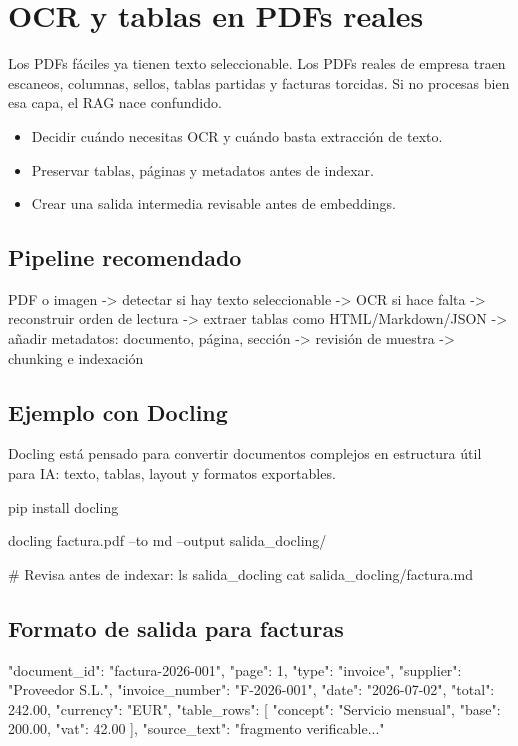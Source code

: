 \documentclass[11pt,a4paper]{book}
\begin{document}
\chapter{OCR y tablas en PDFs reales}
Los PDFs fáciles ya tienen texto seleccionable. Los PDFs reales de empresa traen escaneos, columnas, sellos, tablas partidas y facturas torcidas. Si no procesas bien esa capa, el RAG nace confundido.

\begin{itemize}\item Decidir cuándo necesitas OCR y cuándo basta extracción de texto.\end{itemize}
\begin{itemize}\item Preservar tablas, páginas y metadatos antes de indexar.\end{itemize}
\begin{itemize}\item Crear una salida intermedia revisable antes de embeddings.\end{itemize}
\section{Pipeline recomendado}
\begin{codebox}
PDF o imagen
  -> detectar si hay texto seleccionable
  -> OCR si hace falta
  -> reconstruir orden de lectura
  -> extraer tablas como HTML/Markdown/JSON
  -> añadir metadatos: documento, página, sección
  -> revisión de muestra
  -> chunking e indexación
\end{codebox}
\section{Ejemplo con Docling}
Docling está pensado para convertir documentos complejos en estructura útil para IA: texto, tablas, layout y formatos exportables.

\begin{codebox}
pip install docling

docling factura.pdf --to md --output salida_docling/

# Revisa antes de indexar:
ls salida_docling
cat salida_docling/factura.md
\end{codebox}
\section{Formato de salida para facturas}
\begin{codebox}
{
  "document_id": "factura-2026-001",
  "page": 1,
  "type": "invoice",
  "supplier": "Proveedor S.L.",
  "invoice_number": "F-2026-001",
  "date": "2026-07-02",
  "total": 242.00,
  "currency": "EUR",
  "table_rows": [
    {"concept": "Servicio mensual", "base": 200.00, "vat": 42.00}
  ],
  "source_text": "fragmento verificable..."
}
\end{codebox}
\end{document}

